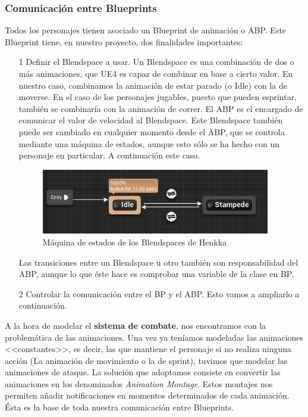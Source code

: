 \subsubsection{Comunicación entre Blueprints}

Todos los personajes tienen asociado un Blueprint de animación o \ac{ABP}. Este Blueprint tiene, en nuestro proyecto, dos finalidades importantes:


\begin{itemize}
\item[1] Definir el Blendspace a usar. Un Blendspace es una combinación de dos o más animaciones, que \ac{UE4} es capaz de combinar en base a cierto valor. En nuestro caso, combinamos la animación de estar parado (o Idle) con la de moverse. En el caso de los personajes jugables, puesto que pueden esprintar, también se combinaría con la animación de correr. El \ac{ABP} es el encargado de comunicar el valor de velocidad al Blendspace. Este Blendspace también puede ser cambiado en cualquier momento desde el \ac{ABP}, que se controla mediante una máquina de estados, aunque esto sólo se ha hecho con un personaje en particular. A continuación este caso.


\begin{figure}[H]
  \centering
  \includegraphics[width=10cm]{./images/Henkka_SM.png}
  \caption{Máquina de estados de los Blendspaces de Henkka}
  \label{HenkkaSM}
\end{figure}


Las transiciones entre un Blendspace u otro también son responsabilidad del \ac{ABP}, aunque lo que éste hace es comprobar una variable de la clase en \ac{BP}.

\item[2] Controlar la comunicación entre el \ac{BP} y el \ac{ABP}. Esto vamos a ampliarlo a continuación.
\end{itemize}


A la hora de modelar el \textbf{sistema de combate}, nos encontramos con la problemática de las animaciones. Una vez ya teníamos modeladas las animaciones <<constantes>>, es decir, las que mantiene el personaje si no realiza ninguna acción (La animación de movimiento o la de sprint), tuvimos que modelar las animaciones de ataque. La solución que adoptamos consiste en convertir las animaciones en los denominados \textit{Animation Montage}. Estos montajes nos permiten añadir notificaciones en momentos determinados de cada animación. Ésta es la base de toda nuestra comunicación entre Blueprints.


